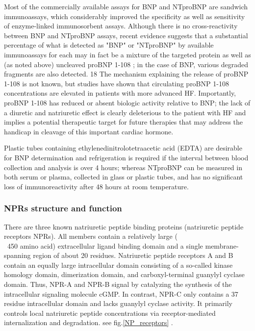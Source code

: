 \documentclass[14pt,a4paper,onecolumn]{extarticle}
\begin{document}
Most of the commercially available assays for BNP and NTproBNP are sandwich immunoassays, which considerably improved the specificity as well as sensitivity of enzyme-linked immunosorbent assays. Although there is no cross-reactivity between BNP and NTproBNP assays, recent evidence suggests that a substantial percentage of what is detected as "BNP" or "NTproBNP" by available immunoassays for each may in fact be a mixture of the targeted protein as well as  (as noted above) uncleaved proBNP 1-108 ; in the case of BNP, various degraded fragments are also detected. 18 The mechanism explaining the release of proBNP 1-108 is not known, but studies have shown that circulating proBNP 1-108 concentrations are elevated in patients with more advanced HF. Importantly, proBNP 1-108 has reduced or absent biologic activity relative to BNP; the lack of a diuretic and natriuretic effect is clearly deleterious to the patient with HF and implies a potential therapeutic target for future therapies that may address the handicap in cleavage of this important cardiac hormone. \citep{Gaggin2014} %

Plastic tubes containing ethylenedinitrolotetraacetic acid (EDTA) are desirable for BNP determination and refrigeration is required if the interval between blood collection and analysis is over 4 hours; whereas NTproBNP can be measured in both serum or plasma, collected in glass or plastic tubes, and has no significant loss of immunoreactivity after 48 hours at room temperature. \citep{Omland2008} %

\subsubsection{NPRs structure and function}

There are three known natriuretic peptide binding proteins (natriuretic peptide receptors NPRs). All members contain a relatively large (\\~450 amino acid) extracellular ligand binding domain and a single membrane-spanning region of about 20 residues. Natriuretic peptide receptors A and B contain an equally large intracellular domain consisting of a so-called kinase homology domain, dimerization domain, and carboxyl-terminal guanylyl cyclase domain. Thus, NPR-A and NPR-B signal by catalyzing the synthesis of the intracellular signaling molecule cGMP. In contrast, NPR-C only contains a 37 residue intracellular domain and lacks guanylyl cyclase activity. It primarily controls local natriuretic peptide concentrations via receptor-mediated internalization and degradation. see fig.\ref{NP_receptors} \citep{Rose2008}.
\end{document}
